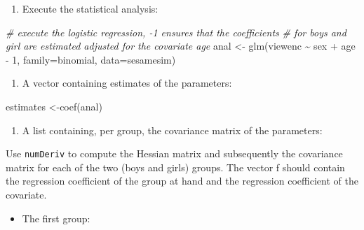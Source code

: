 \documentclass[
]{book}
\newenvironment{Shaded}{\begin{snugshade}}{\end{snugshade}}
\newcommand{\AttributeTok}[1]{\textcolor[rgb]{0.77,0.63,0.00}{#1}}
\newcommand{\CommentTok}[1]{\textcolor[rgb]{0.56,0.35,0.01}{\textit{#1}}}
\newcommand{\DecValTok}[1]{\textcolor[rgb]{0.00,0.00,0.81}{#1}}
\newcommand{\FunctionTok}[1]{\textcolor[rgb]{0.00,0.00,0.00}{#1}}
\newcommand{\NormalTok}[1]{#1}
\newcommand{\OtherTok}[1]{\textcolor[rgb]{0.56,0.35,0.01}{#1}}
\newcommand{\SpecialCharTok}[1]{\textcolor[rgb]{0.00,0.00,0.00}{#1}}
\providecommand{\tightlist}{%
  \setlength{\itemsep}{0pt}\setlength{\parskip}{0pt}}
\begin{document}
\begin{enumerate}
\def\labelenumi{\arabic{enumi})}
\tightlist
\item
  Execute the statistical analysis:
\end{enumerate}

\begin{Shaded}
\begin{Highlighting}[]
\CommentTok{\# execute the logistic regression, {-}1 ensures that the coefficients}
\CommentTok{\# for boys and girl are estimated adjusted for the covariate age}
\NormalTok{anal }\OtherTok{\textless{}{-}} \FunctionTok{glm}\NormalTok{(viewenc }\SpecialCharTok{\textasciitilde{}}\NormalTok{ sex }\SpecialCharTok{+}\NormalTok{ age }\SpecialCharTok{{-}} \DecValTok{1}\NormalTok{, }\AttributeTok{family=}\NormalTok{binomial, }\AttributeTok{data=}\NormalTok{sesamesim)}
\end{Highlighting}
\end{Shaded}

\begin{enumerate}
\def\labelenumi{\alph{enumi})}
\tightlist
\item
  A vector containing estimates of the parameters:
\end{enumerate}

\begin{Shaded}
\begin{Highlighting}[]
\NormalTok{estimates }\OtherTok{\textless{}{-}}\FunctionTok{coef}\NormalTok{(anal)}
\end{Highlighting}
\end{Shaded}

\begin{enumerate}
\def\labelenumi{\alph{enumi})}
\setcounter{enumi}{1}
\tightlist
\item
  A list containing, per group, the covariance matrix of the parameters:
\end{enumerate}

Use \texttt{numDeriv} to compute the Hessian matrix and subsequently the covariance matrix for each of the two (boys and girls) groups. The vector f should contain the regression coefficient of the group at hand and the regression coefficient of the covariate.

\begin{itemize}
\tightlist
\item
  The first group:
\end{itemize}
\end{document}
